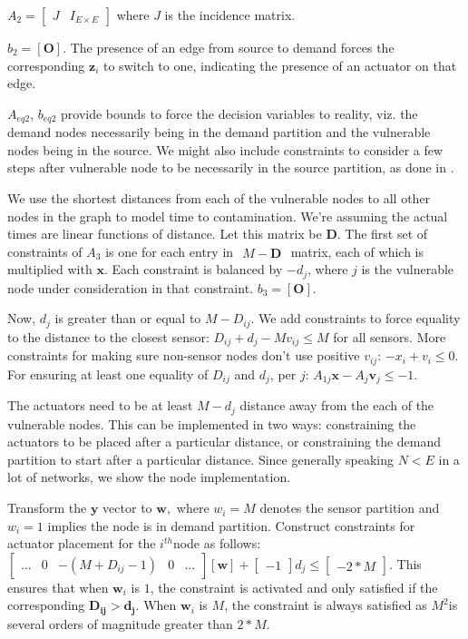 \documentclass[authoryear,preprint,review,12pt]{elsarticle}
\begin{document}
$A_{2}=\left[\begin{array}{cc}
J & I_{E\times E}\end{array}\right]$ where $J$ is the incidence matrix.

$b_{2}=\left[\mathbf{O}\right]$. The presence of an edge from source
to demand forces the corresponding $\mathbf{z}_{i}$ to switch to
one, indicating the presence of an actuator on that edge.

$A_{eq2}$, $b_{eq2}$ provide bounds to force the decision variables
to reality, viz. the demand nodes necessarily being in the demand
partition and the vulnerable nodes being in the source. We might also
include constraints to consider a few steps after vulnerable node
to be necessarily in the source partition, as done in \cite{PalletiActuator}.

We use the shortest distances from each of the vulnerable nodes to
all other nodes in the graph to model time to contamination. We're
assuming the actual times are linear functions of distance. Let this
matrix be $\mathbf{D}$. The first set of constraints of $A_{3}$
is one for each entry in $\begin{array}{c}
M-\mathbf{D}\end{array}$ matrix, each of which is multiplied with $\mathbf{x}$. Each constraint
is balanced by $-d_{j}$, where $j$ is the vulnerable node under
consideration in that constraint. $b_{3}=\left[\mathbf{O}\right].$

Now, $d_{j}$ is greater than or equal to $M-D$$_{ij}$. We add constraints
to force equality to the distance to the closest sensor: $D_{ij}+d_{j}-Mv_{ij}\leq M$
for all sensors. \label{v-inequality-at-sensor-nodes}More constraints
for making sure non-sensor nodes don't use positive $v_{ij}$: $-x_{i}+v_{i}\leq0$.
For ensuring at least one equality of $D{}_{ij}$ and $d_{j}$, per
$j$: $A_{1j}\mathbf{x}-A_{j}\mathbf{v}_{j}\leq-1$.

The actuators need to be at least $M-d_{j}$ distance away from the
each of the vulnerable nodes. This can be implemented in two ways:
constraining the actuators to be placed after a particular distance,
or constraining the demand partition to start after a particular distance.
Since generally speaking $N<E$ in a lot of networks, we show the
node implementation.

Transform the $\mathbf{y}$ vector to $\mathbf{w},$ where $w_{i}=M$
denotes the sensor partition and $w_{i}=1$ implies the node is in
demand partition. Construct constraints for actuator placement for
the $i^{th}$node as follows: $\left[\begin{array}{ccccc}
... & 0 & -(M+D_{ij}-1) & 0 & ...\end{array}\right]\left[\mathbf{\mathbf{w}}\right]+\left[\begin{array}{c}
-1\end{array}\right]d_{j}\leq\left[\begin{array}{c}
-2*M\end{array}\right]$. This ensures that when $\mathbf{w}_{i}$ is $1$, the constraint
is activated and only satisfied if the corresponding $\mathbf{D_{ij}>d_{j}}$.
When $\mathbf{w}_{i}$ is $M$, the constraint is always satisfied
as $M^{2}$is several orders of magnitude greater than $2*M$.
\end{document}
